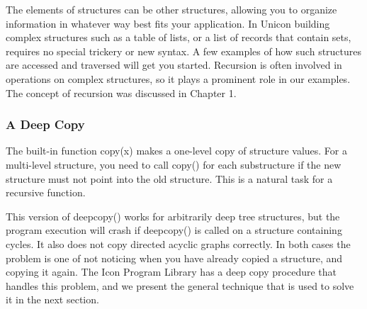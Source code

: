 The elements of structures can be other structures, allowing you to
organize information in whatever way best fits your application. In
Unicon building complex structures such as a table of lists, or a list
of records that contain sets, requires no special trickery or new
syntax. A few examples of how such structures are accessed and
traversed will get you started. Recursion is often
involved in operations on complex structures, so it plays a prominent
role in our examples. The concept of recursion was discussed in Chapter
1.

\subsubsection{A Deep Copy}

The built-in function \textsf{copy(x)} makes a one-level
copy of structure values. For a multi-level structure, you need to call
\textsf{copy()} for each substructure if the new structure must not
point into the old structure. This is a natural task for
a recursive function.


This version of \textsf{deepcopy()} works for
arbitrarily deep tree structures, but the program execution
will crash if \textsf{deepcopy()} is called on a structure containing
cycles. It also does not copy directed acyclic graphs correctly. In
both cases the problem is one of not noticing when you have already
copied a structure, and copying it again. The Icon Program Library has
a deep copy procedure that handles this problem, and we present the
general technique that is used to solve it in the next section.

